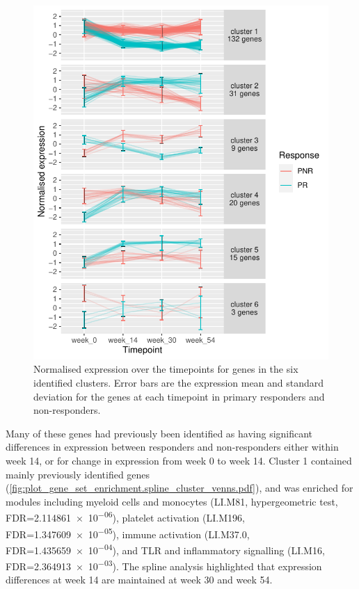 \begin{figure}
    \centering
    \includegraphics[width=1.0\textwidth,page=1]{mainmatter/figures/chapter_04/plot_gene_set_enrichment.spline_cluster_trajectories.pdf}
    \caption{Normalised expression over the timepoints for genes in the six identified clusters. Error bars are the expression mean and standard deviation for the genes at each timepoint in primary responders and non-responders.}
    \label{fig:multipants_dge_spline_cluster_trajectories}
\end{figure}

Many of these genes had previously been identified as having significant differences in expression between responders and non-responders
either within week 14, or for change in expression from week 0 to week 14.
Cluster 1 contained mainly previously identified genes (\autoref{fig:plot_gene_set_enrichment.spline_cluster_venns.pdf}),
and was enriched for modules including 
myeloid cells and monocytes (LI.M81, hypergeometric test, FDR=\num{2.114861e-06}),
platelet activation (LI.M196, FDR=\num{1.347609e-05}),
immune activation (LI.M37.0, FDR=\num{1.435659e-04}),
and TLR and inflammatory signalling (LI.M16, FDR=\num{2.364913e-03}).
The spline analysis highlighted that expression differences at week 14 are maintained at week 30 and week 54.

